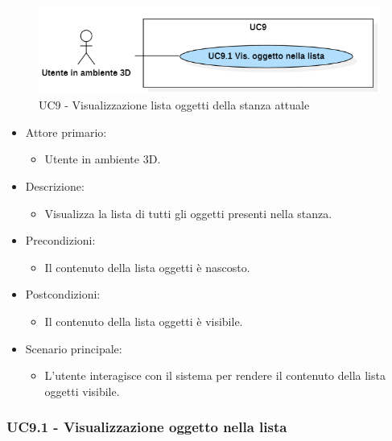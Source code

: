 \begin{figure}[H]
  \renewcommand{\thefigure}{9}
  \includegraphics[width=\linewidth]{./res/images/UC9.png}
  \caption{UC9 - Visualizzazione lista oggetti della stanza attuale}
  \label{fig:UC 9}
\end{figure}

\begin{itemize}

	\item Attore primario: 
	\begin{itemize}
		\item Utente in ambiente 3D.
	\end{itemize}
	\item Descrizione:
	\begin{itemize}
		\item Visualizza la lista di tutti gli oggetti presenti nella stanza.
	\end{itemize}
	
	\item Precondizioni:
	\begin{itemize}
		\item Il contenuto della lista oggetti è nascosto.
	\end{itemize}
	
	\item Postcondizioni:
	\begin{itemize}
		\item Il contenuto della lista oggetti è visibile.
	\end{itemize}
	
	\item Scenario principale:
	\begin{itemize}
		\item L'utente interagisce con il sistema per rendere il contenuto della lista oggetti visibile.
	\end{itemize}
	
\end{itemize}


\subsubsection{UC9.1 - Visualizzazione oggetto nella lista}

